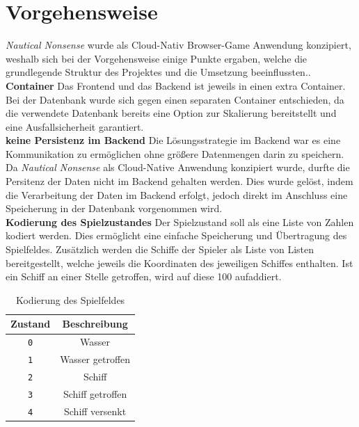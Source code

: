 \documentclass[a4paper, 10pt, conference]{IEEEtran}
\begin{document}
\section{Vorgehensweise}\label{sec:vorgehensweise}
\textit{Nautical Nonsense} wurde als Cloud-Nativ Browser-Game Anwendung konzipiert, weshalb sich bei der Vorgehensweise einige Punkte ergaben, welche die grundlegende Struktur des Projektes und die Umsetzung beeinflussten..\\

\textbf{Container} Das Frontend und das Backend ist jeweils in einen extra Container. Bei der Datenbank wurde sich gegen einen separaten Container entschieden, da die verwendete Datenbank bereits eine Option zur Skalierung bereitstellt und eine Ausfallsicherheit garantiert. \\

\textbf{keine Persistenz im Backend} Die Lösungsstrategie im Backend war es eine Kommunikation zu ermöglichen ohne größere Datenmengen darin zu speichern. Da \textit{Nautical Nonsense} als Cloud-Native Anwendung konzipiert wurde, durfte die Persitenz der Daten nicht im Backend gehalten werden. Dies wurde gelöst, indem die Verarbeitung der Daten im Backend erfolgt, jedoch direkt im Anschluss eine Speicherung in der Datenbank vorgenommen wird. \\

\textbf{Kodierung des Spielzustandes} 
Der Spielzustand soll als eine Liste von Zahlen kodiert werden. Dies ermöglicht eine einfache Speicherung und Übertragung des Spielfeldes. 
Zusätzlich werden die Schiffe der Spieler als Liste von Listen bereitgestellt, welche jeweils die Koordinaten des jeweiligen Schiffes enthalten. Ist ein Schiff an einer Stelle getroffen, wird auf diese 100 aufaddiert. \\

\begin{table}[h!]
    \begin{center}
        \caption{Kodierung des Spielfeldes}
        \label{tab:gamefield}
        \begin{tabular}{|c|c|}
            \textbf{Zustand} & \textbf{Beschreibung}\\
            \hline
            \texttt{0}	& Wasser\\
            \texttt{1}	& Wasser getroffen\\
            \texttt{2}	& Schiff\\
            \texttt{3}	& Schiff getroffen\\
            \texttt{4}	& Schiff versenkt\\
        \end{tabular}
    \end{center}
\end{table}
\end{document}
